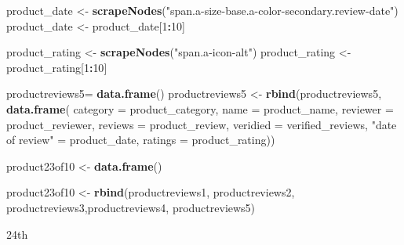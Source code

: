 \documentclass[
]{article}
\newenvironment{Shaded}{\begin{snugshade}}{\end{snugshade}}
\newcommand{\AttributeTok}[1]{\textcolor[rgb]{0.13,0.29,0.53}{#1}}
\newcommand{\DecValTok}[1]{\textcolor[rgb]{0.00,0.00,0.81}{#1}}
\newcommand{\FunctionTok}[1]{\textcolor[rgb]{0.13,0.29,0.53}{\textbf{#1}}}
\newcommand{\NormalTok}[1]{#1}
\newcommand{\OtherTok}[1]{\textcolor[rgb]{0.56,0.35,0.01}{#1}}
\newcommand{\SpecialCharTok}[1]{\textcolor[rgb]{0.81,0.36,0.00}{\textbf{#1}}}
\newcommand{\StringTok}[1]{\textcolor[rgb]{0.31,0.60,0.02}{#1}}
\begin{document}
\begin{Shaded}
\begin{Highlighting}[]
\NormalTok{  product\_date }\OtherTok{\textless{}{-}} \FunctionTok{scrapeNodes}\NormalTok{(}\StringTok{"span.a{-}size{-}base.a{-}color{-}secondary.review{-}date"}\NormalTok{)}
\NormalTok{  product\_date }\OtherTok{\textless{}{-}}\NormalTok{ product\_date[}\DecValTok{1}\SpecialCharTok{:}\DecValTok{10}\NormalTok{]}
  
\NormalTok{  product\_rating }\OtherTok{\textless{}{-}} \FunctionTok{scrapeNodes}\NormalTok{(}\StringTok{"span.a{-}icon{-}alt"}\NormalTok{)}
\NormalTok{  product\_rating }\OtherTok{\textless{}{-}}\NormalTok{ product\_rating[}\DecValTok{1}\SpecialCharTok{:}\DecValTok{10}\NormalTok{]}
  
\NormalTok{  productreviews5}\OtherTok{=} \FunctionTok{data.frame}\NormalTok{()}
\NormalTok{  productreviews5 }\OtherTok{\textless{}{-}} \FunctionTok{rbind}\NormalTok{(productreviews5, }\FunctionTok{data.frame}\NormalTok{(}
                      \AttributeTok{category =}\NormalTok{ product\_category,}
                      \AttributeTok{name =}\NormalTok{ product\_name,}
                      \AttributeTok{reviewer =}\NormalTok{ product\_reviewer,}
                      \AttributeTok{reviews =}\NormalTok{ product\_review,}
                      \AttributeTok{veridied =}\NormalTok{ verified\_reviews,}
                      \StringTok{"date of review"} \OtherTok{=}\NormalTok{ product\_date,}
                      \AttributeTok{ratings =}\NormalTok{ product\_rating))}
  
\NormalTok{  product23of10 }\OtherTok{\textless{}{-}} \FunctionTok{data.frame}\NormalTok{()}
  
\NormalTok{  product23of10 }\OtherTok{\textless{}{-}} \FunctionTok{rbind}\NormalTok{(productreviews1, productreviews2, productreviews3,productreviews4, productreviews5)}
\end{Highlighting}
\end{Shaded}

24th
\end{document}
